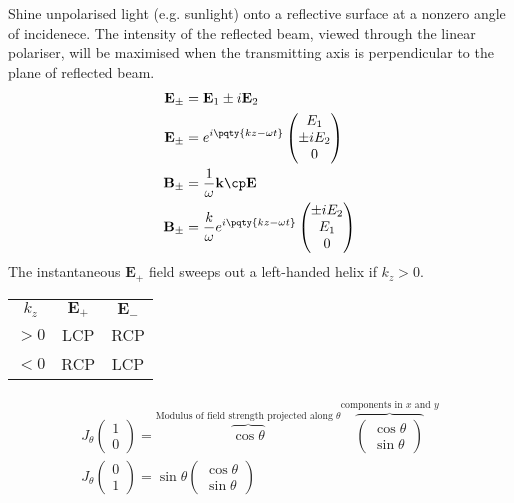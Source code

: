 \documentclass[12pt]{extarticle}
\renewcommand{\bf}{\mathbf}
\begin{document}
    \begin{outline}[enumerate]
        \1 Shine unpolarised light (e.g. sunlight) onto a reflective surface at a nonzero angle of incidenece. The intensity of the reflected beam, viewed through the linear polariser, will be maximised when the transmitting axis is perpendicular to the plane of reflected beam.
        \1 
        \begin{align*}
            \bf E_\pm  &=  \bf E_1 \pm  i\bf E_2\\
            \bf E_\pm  &=  e^{i\pqty{  kz - \omega t}}\begin{pmatrix} E_1 \\\pm i E_2 \\0\end{pmatrix}\\
            \bf B_\pm &=  \frac{1}{\omega }\bf k \cp \bf E\\
            \bf B_\pm  &= \frac{k}{\omega } e^{i\pqty{ kz - \omega t}} \begin{pmatrix} \pm  iE_2\\ E_1\\0 \end{pmatrix} 
        \end{align*}
        The instantaneous \(\bf E_+\) field sweeps out a left-handed helix if \(k_z > 0\).
        \begin{table}[htbp]
            \centering\begin{tabular}{ccc}
                \(k_z\) & \(\bf E_ +\) & \(\bf E_ -\)\\
                \( > 0\)& LCP&RCP\\
                \( < 0\)& RCP&LCP
            \end{tabular}
        \end{table}
        \1 {\eqhold
        \begin{gather*}
            J_\theta \begin{pmatrix} 1\\0  \end{pmatrix} = \overbrace{\cos \theta}^\text{Modulus of field strength projected along $\theta$}\overbrace{\begin{pmatrix} \cos \theta\\ \sin \theta  \end{pmatrix}}^\text{components in $x$ and $y$} \\
            J_\theta \begin{pmatrix} 0\\1 \end{pmatrix} = \sin\theta \begin{pmatrix}  \cos \theta \\ \sin \theta \end{pmatrix}\\

\end{gather*}}
\end{outline}
\end{document}
